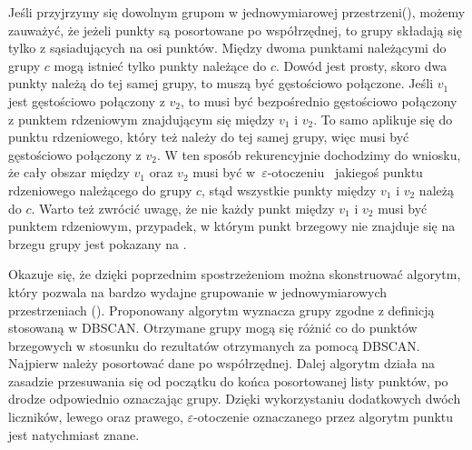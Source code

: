 

Jeśli przyjrzymy się dowolnym grupom w jednowymiarowej przestrzeni\linebreak (), możemy zauważyć, że jeżeli punkty są posortowane po współrzędnej, to grupy składają się tylko z sąsiadujących na osi punktów. Między dwoma punktami należącymi do grupy $ c $ mogą istnieć tylko punkty należące do $ c $. Dowód jest prosty, skoro dwa punkty należą do tej samej grupy, to muszą być gęstościowo połączone. Jeśli $ v_1 $ jest gęstościowo połączony z $ v_2 $, to musi być bezpośrednio gęstościowo połączony z punktem rdzeniowym znajdującym się między $ v_1 $ i $ v_2 $. To samo aplikuje się do punktu rdzeniowego, który też należy do tej samej grupy, więc musi być gęstościowo połączony z $ v_2 $. W ten sposób rekurencyjnie dochodzimy do wniosku, że cały obszar między $ v_1 $ oraz $ v_2 $ musi być \mbox{w $ \varepsilon $-otoczeniu } jakiegoś punktu rdzeniowego należącego do grupy $ c $, stąd wszystkie punkty między $ v_1 $ i $ v_2 $ należą do $ c $. Warto też zwrócić uwagę, że nie każdy punkt między $ v_1 $ i $ v_2 $ musi być punktem rdzeniowym, przypadek, w którym punkt brzegowy nie znajduje się na brzegu grupy jest pokazany na .\par
Okazuje się, że dzięki poprzednim spostrzeżeniom można skonstruować algorytm, który pozwala na bardzo wydajne grupowanie w jednowymiarowych przestrzeniach (). Proponowany algorytm wyznacza grupy zgodne z definicją stosowaną w DBSCAN. Otrzymane grupy mogą się różnić co do punktów brzegowych w stosunku do rezultatów otrzymanych za pomocą DBSCAN. Najpierw należy posortować dane po współrzędnej. Dalej algorytm działa na zasadzie przesuwania się od początku do końca posortowanej listy punktów, po drodze odpowiednio oznaczając grupy. Dzięki wykorzystaniu dodatkowych dwóch liczników, lewego oraz prawego, $ \varepsilon $-otoczenie oznaczanego przez algorytm punktu jest natychmiast znane.\par



